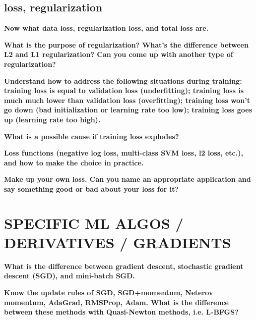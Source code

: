 \documentclass[10pt,letterpaper]{article}
\begin{document}
\subsection{loss, regularization}

\subitem \textbf{ Now what data loss, regularization loss, and total loss are.}
\begin{solution}
\end{solution}

\subitem \textbf{ What is the purpose of regularization? What’s the difference between L2 and L1 regularization? Can you come up with another type of regularization?}
\begin{solution}
\end{solution}

\subitem \textbf{ Understand how to address the following situations during training: training loss is equal to validation loss (underfitting); training loss is much much lower than validation loss (overfitting); training loss won’t go down (bad initialization or learning rate too low); training loss goes up (learning rate too high).}
\begin{solution}
\end{solution}

\subitem \textbf{ What is a possible cause if training loss explodes?}
\begin{solution}
\end{solution}

\subitem \textbf{ Loss functions (negative log loss, multi-class SVM loss, l2 loss, etc.), and how to make the choice in practice.}
\begin{solution}
\end{solution}

\subitem \textbf{ Make up your own loss. Can you name an appropriate application and say something good or bad about your loss for it?}
\begin{solution}
\end{solution}

\section{SPECIFIC ML ALGOS / DERIVATIVES / GRADIENTS}
\subitem \textbf{ What is the difference between gradient descent, stochastic gradient descent (SGD), and mini-batch SGD.}
\begin{solution}
\end{solution}

\subitem \textbf{ Know the update rules of SGD, SGD+momentum, Neterov momentum, AdaGrad, RMSProp, Adam. What is the difference between these methods with Quasi-Newton methods, i.e. L-BFGS?}
\begin{solution}
\end{solution}
\end{document}
